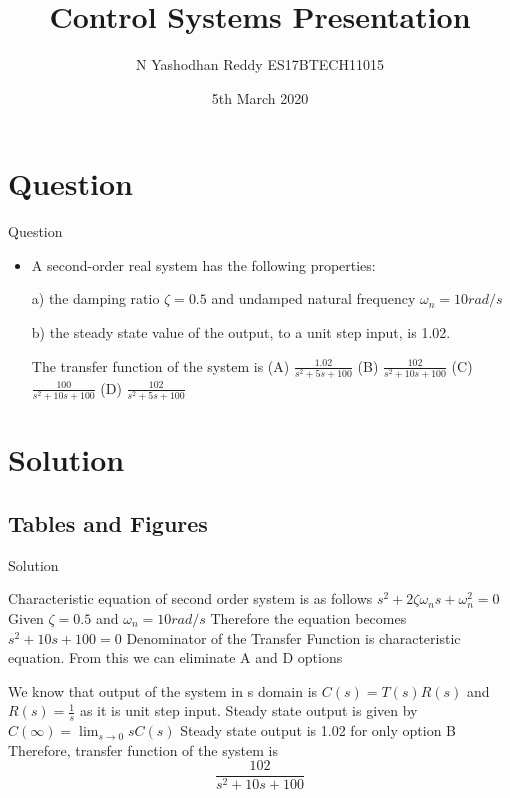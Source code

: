 \documentclass{beamer}
\title[Your Short Title]{Control Systems Presentation}
\author{N Yashodhan Reddy ES17BTECH11015}
\date{5th March 2020}
\begin{document}
\begin{frame}
  \titlepage
\end{frame}


\section{Question}

\begin{frame}{Question}

\begin{itemize}
  \item A second-order real system has the following properties:

a) the damping ratio $\zeta=0.5$ and undamped natural frequency $\omega_n=10rad/s$ 

b) the steady state value of the output, to a unit step input, is 1.02.

The transfer function of the system is\newline
(A) $\frac{1.02}{s^2+5s+100}$    (B) $\frac{102}{s^2+10s+100}$\newline
(C) $\frac{100}{s^2+10s+100}$   (D) $\frac{102}{s^2+5s+100}$
\end{itemize}


\end{frame}

\section{Solution}

\subsection{Tables and Figures}

\begin{frame}{Solution}

 Characteristic equation of second order system is as follows
$s^2+2\zeta\omega_ns+\omega_n^2=0$\newline
Given $\zeta=0.5$ and $\omega_n=10rad/s$\newline
Therefore the equation becomes 
$s^2+10s+100=0$\newline
Denominator of the Transfer Function is characteristic equation. From this we can eliminate A and D options

\end{frame}

\begin{frame}
    We know that output of the system in s domain is
$C(s)=T(s)R(s)$\newline
and $R(s)=\frac{1}{s}$ as it is unit step input.\newline
Steady state output is given by $C(\infty)=\lim_{s \to 0}sC(s)$\newline
Steady state output is 1.02 for only option B\newline
Therefore, transfer function of the system is $$\frac{102}{s^2+10s+100}$$


\end{frame}
\end{document}

